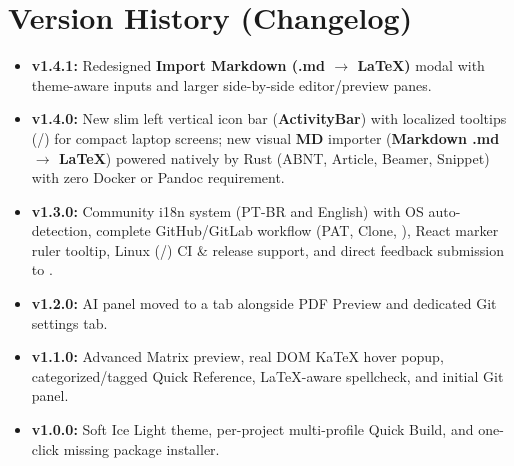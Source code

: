 \documentclass[11pt,a4paper]{article}
\begin{document}
\section{Version History (Changelog)}
\begin{itemize}
  \item \textbf{v1.4.1:} Redesigned \textbf{Import Markdown (.md $\to$ LaTeX)} modal with theme-aware inputs and larger side-by-side editor/preview panes.
  \item \textbf{v1.4.0:} New slim left vertical icon bar (\textbf{ActivityBar}) with localized tooltips (/) for compact laptop screens; new visual \textbf{MD} importer (\textbf{Markdown .md $\to$ LaTeX}) powered natively by Rust (ABNT, Article, Beamer, Snippet) with zero Docker or Pandoc requirement.
  \item \textbf{v1.3.0:} Community i18n system (PT-BR and English) with OS auto-detection, complete GitHub/GitLab workflow (PAT, Clone, ), React marker ruler tooltip, Linux (/) CI \& release support, and direct feedback submission to .
  \item \textbf{v1.2.0:} AI panel moved to a tab alongside PDF Preview and dedicated Git settings tab.
  \item \textbf{v1.1.0:} Advanced Matrix preview, real DOM KaTeX hover popup, categorized/tagged Quick Reference, LaTeX-aware spellcheck, and initial Git panel.
  \item \textbf{v1.0.0:} Soft Ice Light theme, per-project multi-profile Quick Build, and one-click missing  package installer.
\end{itemize}
\end{document}
